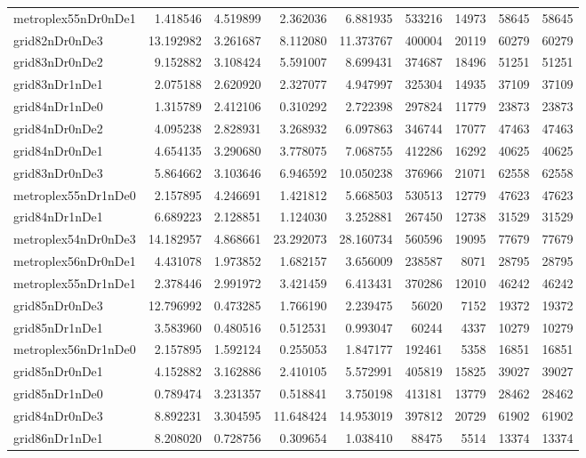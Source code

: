\begin{longtable}{|l|r|r|r|r|r|r|r|r|}
metroplex55nDr0nDe1 & 1.418546 & 4.519899 & 2.362036 & 6.881935 & 533216 & 14973 & 58645 & 58645 \\
grid82nDr0nDe3 & 13.192982 & 3.261687 & 8.112080 & 11.373767 & 400004 & 20119 & 60279 & 60279 \\
grid83nDr0nDe2 & 9.152882 & 3.108424 & 5.591007 & 8.699431 & 374687 & 18496 & 51251 & 51251 \\
grid83nDr1nDe1 & 2.075188 & 2.620920 & 2.327077 & 4.947997 & 325304 & 14935 & 37109 & 37109 \\
grid84nDr1nDe0 & 1.315789 & 2.412106 & 0.310292 & 2.722398 & 297824 & 11779 & 23873 & 23873 \\
grid84nDr0nDe2 & 4.095238 & 2.828931 & 3.268932 & 6.097863 & 346744 & 17077 & 47463 & 47463 \\
grid84nDr0nDe1 & 4.654135 & 3.290680 & 3.778075 & 7.068755 & 412286 & 16292 & 40625 & 40625 \\
grid83nDr0nDe3 & 5.864662 & 3.103646 & 6.946592 & 10.050238 & 376966 & 21071 & 62558 & 62558 \\
metroplex55nDr1nDe0 & 2.157895 & 4.246691 & 1.421812 & 5.668503 & 530513 & 12779 & 47623 & 47623 \\
grid84nDr1nDe1 & 6.689223 & 2.128851 & 1.124030 & 3.252881 & 267450 & 12738 & 31529 & 31529 \\
metroplex54nDr0nDe3 & 14.182957 & 4.868661 & 23.292073 & 28.160734 & 560596 & 19095 & 77679 & 77679 \\
metroplex56nDr0nDe1 & 4.431078 & 1.973852 & 1.682157 & 3.656009 & 238587 & 8071 & 28795 & 28795 \\
metroplex55nDr1nDe1 & 2.378446 & 2.991972 & 3.421459 & 6.413431 & 370286 & 12010 & 46242 & 46242 \\
grid85nDr0nDe3 & 12.796992 & 0.473285 & 1.766190 & 2.239475 & 56020 & 7152 & 19372 & 19372 \\
grid85nDr1nDe1 & 3.583960 & 0.480516 & 0.512531 & 0.993047 & 60244 & 4337 & 10279 & 10279 \\
metroplex56nDr1nDe0 & 2.157895 & 1.592124 & 0.255053 & 1.847177 & 192461 & 5358 & 16851 & 16851 \\
grid85nDr0nDe1 & 4.152882 & 3.162886 & 2.410105 & 5.572991 & 405819 & 15825 & 39027 & 39027 \\
grid85nDr1nDe0 & 0.789474 & 3.231357 & 0.518841 & 3.750198 & 413181 & 13779 & 28462 & 28462 \\
grid84nDr0nDe3 & 8.892231 & 3.304595 & 11.648424 & 14.953019 & 397812 & 20729 & 61902 & 61902 \\
grid86nDr1nDe1 & 8.208020 & 0.728756 & 0.309654 & 1.038410 & 88475 & 5514 & 13374 & 13374 \\

\end{longtable}
